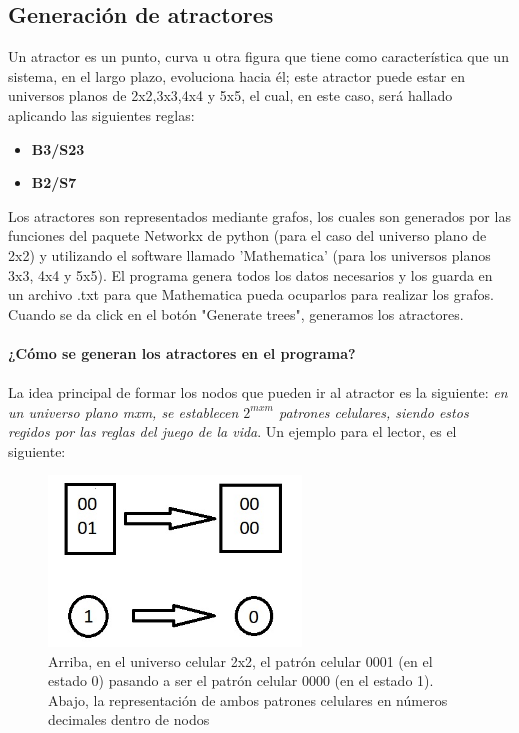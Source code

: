 \documentclass[12pt,a4paper]{book}
\begin{document}
	\subsection{Generación de atractores}
	Un atractor es un punto, curva u otra figura que tiene como característica que un sistema, en el largo plazo, evoluciona hacia él; este atractor puede estar en universos planos de 2x2,3x3,4x4 y 5x5, el cual, en este caso, será hallado aplicando las siguientes reglas:
	
	\begin{itemize}
		\item \textbf{B3/S23}
		\item \textbf{B2/S7}
	\end{itemize}
	Los atractores son representados mediante grafos, los cuales son generados por las funciones del paquete Networkx de python (para el caso del universo plano de 2x2) y utilizando el software llamado 'Mathematica' (para los universos planos 3x3, 4x4 y 5x5). El programa genera todos los datos necesarios y los guarda en un archivo .txt para que Mathematica pueda ocuparlos para realizar los grafos. Cuando se da click en el botón "Generate trees", generamos los atractores. \\\\
	\textbf{¿Cómo se generan los atractores en el programa?}
	\\\\
	La idea principal de formar los nodos que pueden ir al atractor es la siguiente: \textit{en un universo plano mxm, se establecen $2^{mxm}$ patrones celulares, siendo estos regidos por las reglas del juego de la vida}. Un ejemplo para el lector, es el siguiente:
	\begin{figure}[H]
	\centering
	\includegraphics[width=0.6\textwidth]{GENACT}
	\caption{Arriba, en el universo celular 2x2, el patrón celular 0001 (en el estado 0) pasando a ser el patrón celular 0000 (en el estado 1). Abajo, la representación de ambos patrones celulares en números decimales dentro de nodos}
\end{figure}
\end{document}

